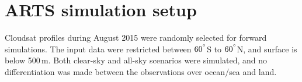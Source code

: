 \documentclass[amt, manuscript]{copernicus}
\begin{document}











\appendix
\section{ARTS simulation setup}    %
\label{appendix:ARTS_setup}
%
Cloudsat profiles during August 2015 were randomly selected for forward simulations. The input data were restricted between $60^{^{\circ}}$S to $60^{^{\circ}}$N, and surface is below 500\,m. Both clear-sky and all-sky scenarios were simulated, and no differentiation was made between the observations over ocean/sea and land. 
\end{document}
